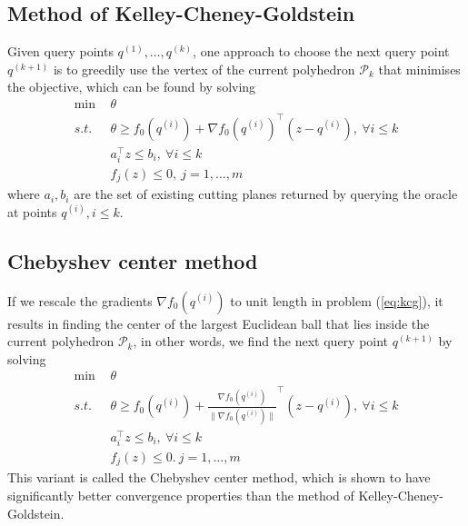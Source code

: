 \documentclass[9pt]{extarticle}
\newcommand{\eat}[1]{}
\begin{document}
\subsection{Method of Kelley-Cheney-Goldstein}
Given query points $q^{(1)}, \dots, q^{(k)}$, 
one approach to choose the next query point $q^{(k+1)}$ is to greedily use the vertex of the current polyhedron $\mathcal{P}_k$ 
that minimises the objective, which can be found by solving 
\begin{equation}
\label{eq:kcg}
\begin{aligned}
\min   ~& \theta  \\
s.t.~~ ~& \theta \ge f_0(q^{(i)}) + \nabla f_0(q^{(i)})^\top (z - q^{(i)}),~ \forall i \le k \\
        & a_i^\top z \le b_i,~ \forall i \le k \\
        & f_j(z) \le 0,~ j = 1, \dots, m
\end{aligned}
\end{equation}
where $a_i, b_i$ are the set of existing cutting planes returned by querying the oracle at points $q^{(i)}, i \le k$.


\subsection{Chebyshev center method}
If we rescale the gradients $\nabla f_0(q^{(i)})$ to unit length in problem (\ref{eq:kcg}), 
it results in finding the center of the largest Euclidean ball that lies inside the current polyhedron $\mathcal{P}_k$,
in other words, we find the next query point $q^{(k+1)}$ by solving
\begin{equation}
\label{eq:chebyshev}
\begin{aligned}
\min   ~& \theta  \\
s.t.~~ ~& \theta \ge f_0(q^{(i)}) + \frac{\nabla f_0(q^{(i)})}{\|\nabla f_0(q^{(i)})\|} ^\top (z - q^{(i)}),~ \forall i \le k \\
        & a_i^\top z \le b_i,~ \forall i \le k \\
        & f_j(z) \le 0.~ j = 1, \dots, m
\end{aligned}
\end{equation}
This variant is called the Chebyshev center method, which is shown to have significantly better convergence properties than the method of Kelley-Cheney-Goldstein.
\eat{citation}
\end{document}

